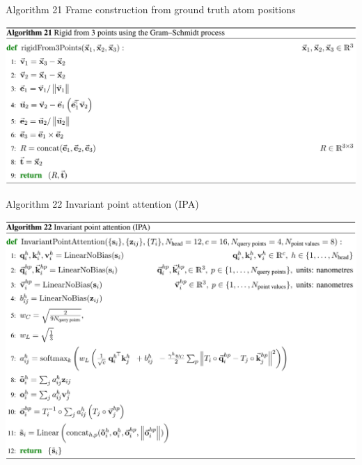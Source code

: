 \documentclass[presentation, smaller]{beamer}
\begin{document}
\begin{frame}[label={sec:org3c35ae2}]{Algorithm 21 Frame construction from ground truth atom positions \cite{jumperHighlyAccurateProtein2021}}
\begin{center}
\includegraphics[height=\textheight]{./imgs/algo21_gram_schmidt.png}
\end{center}
\end{frame}
\begin{frame}[label={sec:org9db4929}]{Algorithm 22 Invariant point attention (IPA) \cite{jumperHighlyAccurateProtein2021}}
\begin{center}
\includegraphics[height=\textheight]{./imgs/algo22_ipa.png}
\end{center}
\end{frame}
\end{document}
